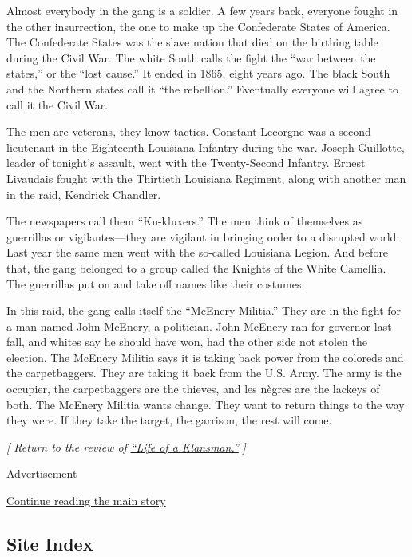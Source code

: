 Almost everybody in the gang is a soldier. A few years back, everyone
fought in the other insurrection, the one to make up the Confederate
States of America. The Confederate States was the slave nation that died
on the birthing table during the Civil War. The white South calls the
fight the ``war between the states,'' or the ``lost cause.'' It ended in
1865, eight years ago. The black South and the Northern states call it
``the rebellion.'' Eventually everyone will agree to call it the Civil
War.

The men are veterans, they know tactics. Constant Lecorgne was a second
lieutenant in the Eighteenth Louisiana Infantry during the war. Joseph
Guillotte, leader of tonight's assault, went with the Twenty-Second
Infantry. Ernest Livaudais fought with the Thirtieth Louisiana Regiment,
along with another man in the raid, Kendrick Chandler.

The newspapers call them ``Ku-kluxers.'' The men think of themselves as
guerrillas or vigilantes---they are vigilant in bringing order to a
disrupted world. Last year the same men went with the so-called
Louisiana Legion. And before that, the gang belonged to a group called
the Knights of the White Camellia. The guerrillas put on and take off
names like their costumes.

In this raid, the gang calls itself the ``McEnery Militia.'' They are in
the fight for a man named John McEnery, a politician. John McEnery ran
for governor last fall, and whites say he should have won, had the other
side not stolen the election. The McEnery Militia says it is taking back
power from the coloreds and the carpetbaggers. They are taking it back
from the U.S. Army. The army is the occupier, the carpetbaggers are the
thieves, and les nègres are the lackeys of both. The McEnery Militia
wants change. They want to return things to the way they were. If they
take the target, the garrison, the rest will come.

\emph{{[} Return to the review of}
\href{https://www.nytimes.com/2020/08/04/books/review/life-of-a-klansman-edward-ball.html}{\emph{``Life
of a Klansman.''}} \emph{{]}}

Advertisement

\protect\hyperlink{after-bottom}{Continue reading the main story}

\hypertarget{site-index}{%
\subsection{Site Index}\label{site-index}}

